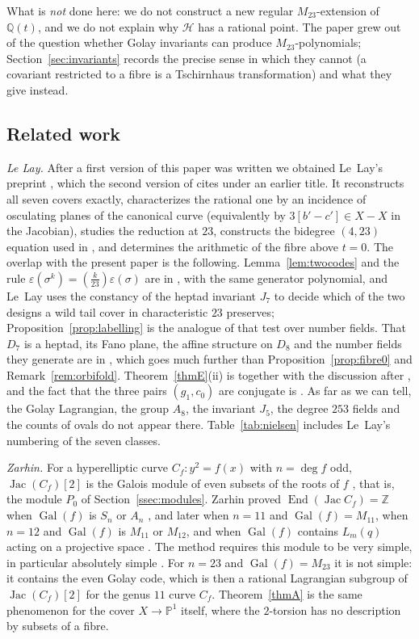 \documentclass[11pt]{amsart}
\theoremstyle{definition}
\newcommand{\QQ}{\mathbb{Q}}
\newcommand{\ZZ}{\mathbb{Z}}
\newcommand{\PP}{\mathbb{P}}
\newcommand{\Gal}{\operatorname{Gal}}
\newcommand{\End}{\operatorname{End}}
\newcommand{\Jac}{\operatorname{Jac}}
\newcommand{\M}{M_{23}}
\newcommand{\cH}{\mathcal{H}}
\begin{document}
What is \emph{not} done here: we do not construct a new regular $\M$-extension of $\QQ(t)$, and we do not explain why $\cH$ has a rational point. The paper grew out of the question whether Golay invariants can produce $\M$-polynomials; Section~\ref{sec:invariants} records the precise sense in which they cannot (a covariant restricted to a fibre is a Tschirnhaus transformation) and what they give instead.

\subsection{Related work}
\emph{Le Lay.} After a first version of this paper was written we obtained Le~Lay's preprint \cite{LeLay26}, which the second version of \cite{HJLPPZ26} cites under an earlier title. It reconstructs all seven covers exactly, characterizes the rational one by an incidence of osculating planes of the canonical curve (equivalently by $3[b'-c']\in X-X$ in the Jacobian), studies the reduction at $23$, constructs the bidegree $(4,23)$ equation used in \cite{HJLPPZ26}, and determines the arithmetic of the fibre above $t=0$. The overlap with the present paper is the following. Lemma~\ref{lem:twocodes} and the rule $\varepsilon(\sigma^k)=\left(\frac{k}{23}\right)\varepsilon(\sigma)$ are in \cite[\S5.4, Prop.~8.4]{LeLay26}, with the same generator polynomial, and Le~Lay uses the constancy of the heptad invariant $J_7$ to decide which of the two designs a wild tail cover in characteristic $23$ preserves; Proposition~\ref{prop:labelling} is the analogue of that test over number fields. That $D_7$ is a heptad, its Fano plane, the affine structure on $D_8$ and the number fields they generate are in \cite[\S8]{LeLay26}, which goes much further than Proposition~\ref{prop:fibre0} and Remark~\ref{rem:orbifold}. Theorem~\ref{thmE}(ii) is \cite[Thm.~8.20]{LeLay26} together with the discussion after \cite[Thm.~8.12]{LeLay26}, and the fact that the three pairs $(g_1,c_0)$ are conjugate is \cite[Prop.~8.21]{LeLay26}. As far as we can tell, the Golay Lagrangian, the group $A_8$, the invariant $J_5$, the degree $253$ fields and the counts of ovals do not appear there. Table~\ref{tab:nielsen} includes Le~Lay's numbering of the seven classes.

\emph{Zarhin.} For a hyperelliptic curve $C_f\colon y^2=f(x)$ with $n=\deg f$ odd, $\Jac(C_f)[2]$ is the Galois module of even subsets of the roots of $f$ \cite[\S4]{Zarhin00}, that is, the module $P_0$ of Section~\ref{ssec:modules}. Zarhin proved $\End(\Jac C_f)=\ZZ$ when $\Gal(f)$ is $S_n$ or $A_n$ \cite[Thm.~2.1]{Zarhin00}, and later when $n=11$ and $\Gal(f)=M_{11}$, when $n=12$ and $\Gal(f)$ is $M_{11}$ or $M_{12}$, and when $\Gal(f)$ contains $L_m(q)$ acting on a projective space \cite[Thm.~2.4]{Zarhin02}. The method requires this module to be very simple, in particular absolutely simple \cite[Remarks~4.2]{Zarhin02}. For $n=23$ and $\Gal(f)=\M$ it is not simple: it contains the even Golay code, which is then a rational Lagrangian subgroup of $\Jac(C_f)[2]$ for the genus $11$ curve $C_f$. Theorem~\ref{thmA} is the same phenomenon for the cover $X\to\PP^1$ itself, where the $2$-torsion has no description by subsets of a fibre.
\end{document}
